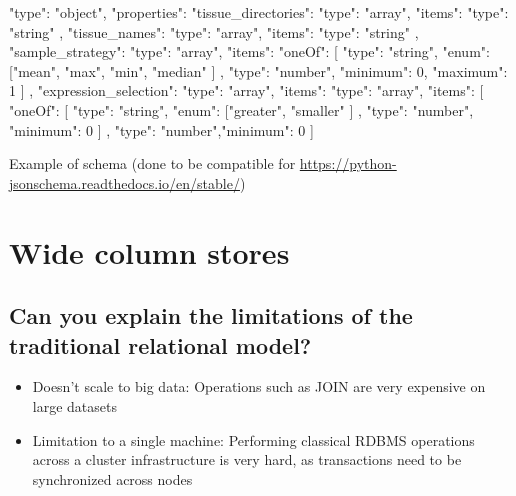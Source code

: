 \documentclass{article}
\begin{document}
\begin{center}
 \begin{listing}
   \begin{json}
     {"type": "object",
    "properties": {
        "tissue_directories": {
            "type": "array",
            "items": {
                "type": "string"
            }
        },
        "tissue_names": {
            "type": "array",
            "items": {
                "type": "string"
            }
        },
        "sample_strategy": {
            "type": "array",
            "items": {
                "oneOf": [
                    {
                        "type": "string",
                        "enum": ["mean", "max", "min", "median"
                        ]
                    },
                    {
                        "type": "number", "minimum": 0, "maximum": 1
                    }
                ]
            }
        },
        "expression_selection": {
            "type": "array",
            "items": {
                "type": "array",
                "items": [
                    {
                        "oneOf": [
                            {
                                "type": "string",
                                "enum": ["greater", "smaller"
                                ]
                            },
                            {
                                "type": "number", "minimum": 0
                            }
                        ]
                    },
                    {
                        "type": "number","minimum": 0
                    }
                    ]
                  }
                }
              }
    }
   \end{json}
    \caption[Test]{Example of schema (done to be compatible for \url{https://python-jsonschema.readthedocs.io/en/stable/})}
 \label{lst:test3}
 \end{listing}
\end{center}





\section{Wide column stores}
\subsection{Can you explain the limitations of the traditional relational model?}

\begin{itemize}
    \item Doesn't scale to big data: Operations such as JOIN are very expensive on large datasets
    \item Limitation to a single machine: Performing classical RDBMS operations across a cluster infrastructure is very hard, as transactions need to be synchronized across nodes
\end{itemize}
\end{document}

